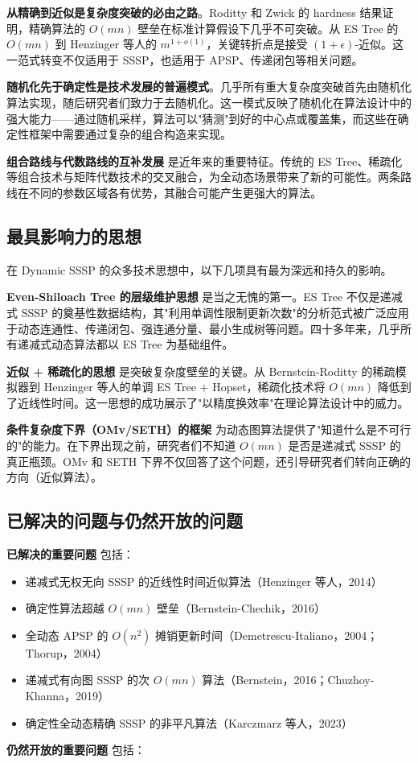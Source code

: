 \documentclass[12pt,a4paper]{ctexart}
\begin{document}
\textbf{从精确到近似是复杂度突破的必由之路}。Roditty 和 Zwick 的 hardness 结果证明，精确算法的 $O(mn)$ 壁垒在标准计算假设下几乎不可突破。从 ES Tree 的 $O(mn)$ 到 Henzinger 等人的 $m^{1+o(1)}$，关键转折点是接受 $(1+\epsilon)$-近似。这一范式转变不仅适用于 SSSP，也适用于 APSP、传递闭包等相关问题。

\textbf{随机化先于确定性是技术发展的普遍模式}。几乎所有重大复杂度突破首先由随机化算法实现，随后研究者们致力于去随机化。这一模式反映了随机化在算法设计中的强大能力——通过随机采样，算法可以"猜测"到好的中心点或覆盖集，而这些在确定性框架中需要通过复杂的组合构造来实现。

\textbf{组合路线与代数路线的互补发展} 是近年来的重要特征。传统的 ES Tree、稀疏化等组合技术与矩阵代数技术的交叉融合，为全动态场景带来了新的可能性。两条路线在不同的参数区域各有优势，其融合可能产生更强大的算法。

\subsection{最具影响力的思想}

在 Dynamic SSSP 的众多技术思想中，以下几项具有最为深远和持久的影响。

\textbf{Even-Shiloach Tree 的层级维护思想} 是当之无愧的第一。ES Tree 不仅是递减式 SSSP 的奠基性数据结构，其"利用单调性限制更新次数"的分析范式被广泛应用于动态连通性、传递闭包、强连通分量、最小生成树等问题。四十多年来，几乎所有递减式动态算法都以 ES Tree 为基础组件。

\textbf{近似 + 稀疏化的思想} 是突破复杂度壁垒的关键。从 Bernstein-Roditty 的稀疏模拟器到 Henzinger 等人的单调 ES Tree + Hopset，稀疏化技术将 $O(mn)$ 降低到了近线性时间。这一思想的成功展示了"以精度换效率"在理论算法设计中的威力。

\textbf{条件复杂度下界（OMv/SETH）的框架} 为动态图算法提供了"知道什么是不可行的"的能力。在下界出现之前，研究者们不知道 $O(mn)$ 是否是递减式 SSSP 的真正瓶颈。OMv 和 SETH 下界不仅回答了这个问题，还引导研究者们转向正确的方向（近似算法）。

\subsection{已解决的问题与仍然开放的问题}

\textbf{已解决的重要问题} 包括：

\begin{itemize}
\item 递减式无权无向 SSSP 的近线性时间近似算法（Henzinger 等人，2014）
\item 确定性算法超越 $O(mn)$ 壁垒（Bernstein-Chechik，2016）
\item 全动态 APSP 的 $O(n^2)$ 摊销更新时间（Demetrescu-Italiano，2004；Thorup，2004）
\item 递减式有向图 SSSP 的次 $O(mn)$ 算法（Bernstein，2016；Chuzhoy-Khanna，2019）
\item 确定性全动态精确 SSSP 的非平凡算法（Karczmarz 等人，2023）

\end{itemize}
\textbf{仍然开放的重要问题} 包括：
\end{document}
